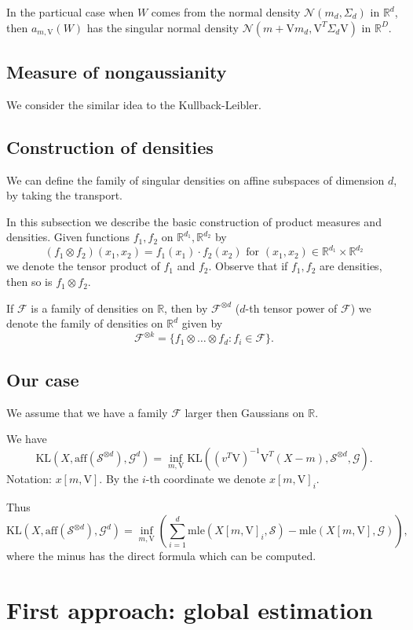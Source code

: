 \documentclass[12pt]{article}
\def\R{\mathbb{R}}
\def\v{\mathrm{V}}
\def\F{\mathcal{F}}
\def\G{\mathcal{G}}
\def\S{\mathcal{S}}
\def\KL{\mathrm{KL}}
\def\for{\mbox{  for }}
\def\mle{\mathrm{mle}}
\def\aff{\mathrm{aff}}
\def\nor{\mathcal{N}}
\theoremstyle{definition}
\begin{document}
In the particual case when $W$ comes from the normal density $\nor(m_d,\Sigma_d)$ in $\R^d$, then $a_{m,\v}(W)$ has the singular normal density $\nor(m+\v m_d,\v^T \Sigma_d \v )$ in $\R^D$.


\subsection{Measure of nongaussianity}

We consider the similar idea to the Kullback-Leibler.

\subsection{Construction of densities}

We can define the family of singular densities on affine subspaces of 
dimension $d$, by taking the transport.


In this subsection we describe the basic construction of product measures and densities. Given functions $f_1,f_2$ on $\R^{d_1},\R^{d_2}$ by 
$$
(f_1 \otimes f_2)(x_1,x_2)=f_1(x_1) \cdot f_2(x_2) \for (x_1,x_2) \in \R^{d_1} 
\times \R^{d_2}
$$ 
we denote the tensor
product of $f_1$ and $f_2$. Observe that if $f_1,f_2$ are densities, then so is
$f_1 \otimes f_2$.

If $\F$ is a family of densities on $\R$, then by $\F^{\otimes d}$ ($d$-th tensor power of $\F$) we denote
the family of densities on $\R^d$ given by
$$
\F^{\otimes k}=\{f_1 \otimes \ldots \otimes f_d : f_i \in \F\}.
$$




\subsection{Our case}

We assume that we have a family $\F$ larger then Gaussians on $\R$.

We have
$$
\KL(X,\aff(\S^{\otimes d}),\G^d)=\inf_{m,\v} \KL((v^T\v)^{-1}\v^T(X-m),\S^{\otimes d},\G).
$$
Notation: $x[m,\v]$. By the $i$-th coordinate we denote $x[m,\v]_i$.

Thus 
$$
\KL(X,\aff(\S^{\otimes d}),\G^d)=\inf_{m,\v} \left( \sum_{i=1}^d \mle(X[m,\v]_i,\S)
-\mle(X[m,\v],\G)
\right),
$$
where the minus has the direct formula which can be computed.


\section{First approach: global estimation}
\end{document}
